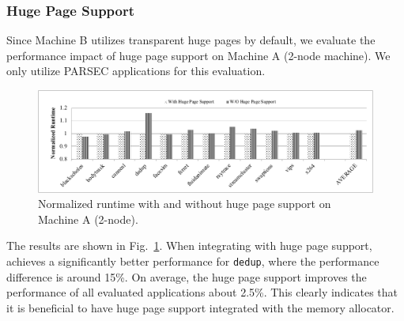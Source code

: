 





\subsubsection{Huge Page Support} 
Since Machine B utilizes transparent huge pages by default, we evaluate the performance impact of huge page support on Machine A (2-node machine). We only utilize PARSEC applications for this evaluation. 

\begin{figure}[!h]
    \centering
    \includegraphics[width=\textwidth]{figure/hugepage.pdf}
    \caption{Normalized runtime with and without huge page support on Machine A (2-node).}
    \label{fig:hugepage}
\end{figure}

The results are shown in Fig.~\ref{fig:hugepage}. When integrating with huge page support, \NM{} achieves a significantly better performance for \texttt{dedup}, where the performance difference is around 15\%. On average,  the huge page support improves the performance of all evaluated applications about 2.5\%. This clearly indicates that it is beneficial to have huge page support integrated with the memory allocator.  


